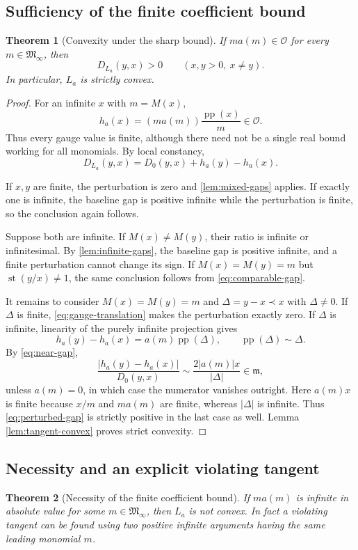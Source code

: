 \documentclass[11pt,letterpaper]{article}
\numberwithin{equation}{section}
\newtheorem{theorem}{Theorem}[section]
\theoremstyle{plain}
\theoremstyle{definition}
\theoremstyle{remark}
\newcommand{\Ocal}{\mathcal O}
\newcommand{\mi}{\mathfrak m}
\newcommand{\Minf}{\mathfrak M_{\infty}}
\newcommand{\pp}{\operatorname{pp}}
\newcommand{\st}{\operatorname{st}}
\newcommand{\abs}[1]{\lvert#1\rvert}
\begin{document}
\subsection{Sufficiency of the finite coefficient bound}
\begin{theorem}[Convexity under the sharp bound]\label{thm:sufficiency}
If $m a(m)\in\Ocal$ for every $m\in\Minf$, then
\begin{equation}\label{eq:gauge-strict-support}
 D_{L_a}(y,x)>0\qquad(x,y>0,\ x\ne y).
\end{equation}
In particular, $L_a$ is strictly convex.
\end{theorem}

\begin{proof}
For an infinite $x$ with $m=M(x)$,
\[
 h_a(x)=(m a(m))\frac{\pp(x)}m\in\Ocal.
\]
Thus every gauge value is finite, although there need not be a single real
bound working for all monomials. By local constancy,
\begin{equation}\label{eq:perturbed-gap}
 D_{L_a}(y,x)=D_0(y,x)+h_a(y)-h_a(x).
\end{equation}

If $x,y$ are finite, the perturbation is zero and
\cref{lem:mixed-gaps} applies. If exactly one is infinite, the baseline gap
is positive infinite while the perturbation is finite, so the conclusion
again follows.

Suppose both are infinite. If $M(x)\ne M(y)$, their ratio is infinite or
infinitesimal. By \cref{lem:infinite-gaps}, the baseline gap is positive
infinite, and a finite perturbation cannot change its sign.
If $M(x)=M(y)=m$ but $\st(y/x)\ne1$, the same conclusion follows from
\eqref{eq:comparable-gap}.

It remains to consider $M(x)=M(y)=m$ and
$\Delta=y-x\prec x$ with $\Delta\ne0$. If $\Delta$ is finite,
\eqref{eq:gauge-translation} makes the perturbation exactly zero.
If $\Delta$ is infinite, linearity of the purely infinite projection gives
\[
 h_a(y)-h_a(x)=a(m)\pp(\Delta),\qquad
 \pp(\Delta)\sim\Delta.
\]
By \eqref{eq:near-gap},
\[
 \frac{\abs{h_a(y)-h_a(x)}}{D_0(y,x)}
 \sim\frac{2\abs{a(m)}x}{\abs\Delta}\in\mi,
\]
unless $a(m)=0$, in which case the numerator vanishes outright.
Here $a(m)x$ is finite because $x/m$ and $m a(m)$ are finite, whereas
$\abs\Delta$ is infinite. Thus \eqref{eq:perturbed-gap} is strictly
positive in the last case as well. Lemma \ref{lem:tangent-convex} proves
strict convexity.
\end{proof}

\subsection{Necessity and an explicit violating tangent}
\begin{theorem}[Necessity of the finite coefficient bound]\label{thm:necessity}
If $m a(m)$ is infinite in absolute value for some $m\in\Minf$, then
$L_a$ is not convex. In fact a violating tangent can be found using two
positive infinite arguments having the same leading monomial $m$.
\end{theorem}
\end{document}

